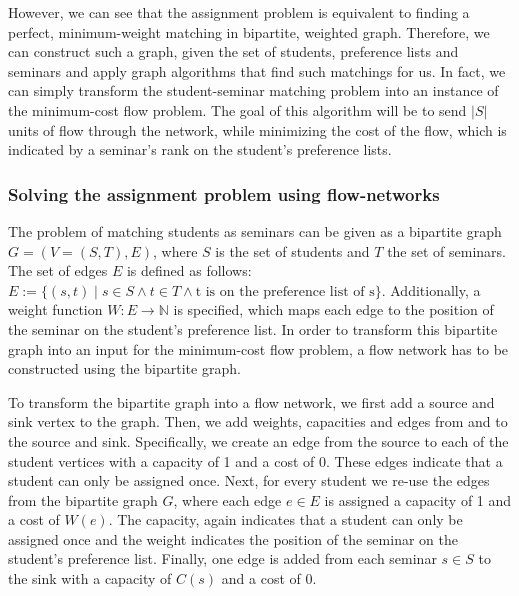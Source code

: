 However, we can see that the assignment problem is equivalent to finding a perfect, minimum-weight matching in bipartite, weighted graph. Therefore, we can construct such a graph, given the set of students, preference lists and seminars and apply graph algorithms that find such matchings for us. In fact, we can simply transform the student-seminar matching problem into an instance of the minimum-cost flow problem. The goal of this algorithm will be to send $|S|$ units of flow through the network, while minimizing the cost of the flow, which is indicated by a seminar's rank on the student's preference lists.

\subsubsection{Solving the assignment problem using flow-networks}
The problem of matching students as seminars can be given as a bipartite graph $G=(V=(S, T), E)$, where $S$ is the set of students and $T$ the set of seminars. The set of edges $E$ is defined as follows: $E:= \{(s, t) \mid s \in S \land t \in T \land \mbox{t is on the preference list of s}\}$. Additionally, a weight function $W: E \rightarrow  \mathbb{N}$ is specified, which maps each edge to the position of the seminar on the student's preference list. In order to transform this bipartite graph into an input for the minimum-cost flow problem, a flow network has to be constructed using the bipartite graph.

To transform the bipartite graph into a flow network, we first add a source and sink vertex to the graph. Then, we add weights, capacities and edges from and to the source and sink. Specifically, we create an edge from the source to each of the student vertices with a capacity of 1 and a cost of 0. These edges indicate that a student can only be assigned once. Next, for every student we re-use the edges from the bipartite graph $G$, where each edge $e \in E$ is assigned a capacity of 1 and a cost of $W(e)$. The capacity, again indicates that a student can only be assigned once and the weight indicates the position of the seminar on the student's preference list. Finally, one edge is added from each seminar $s \in S$ to the sink with a capacity of $C(s)$ and a cost of 0. 

